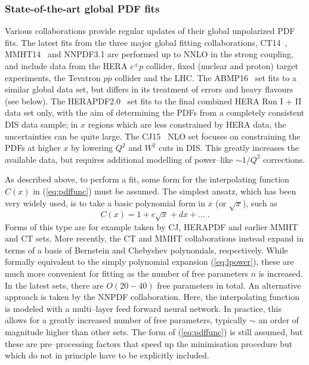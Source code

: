 \subsubsection{State-of-the-art global PDF fits}

Various collaborations provide regular updates of their global unpolarized
PDF fits.
%
The latest fits from the three major global fitting collaborations, CT14~\cite{Dulat:2015mca}, MMHT14~\cite{Harland-Lang:2014zoa} and NNPDF3.1 are performed up to NNLO in the strong coupling, and include data from the HERA $e^{\pm} p$ collider, fixed (nuclear and proton) target experiments, the Tevatron $p\overline{p}$ collider and the LHC. 
%
The ABMP16~\cite{Alekhin:2017kpj} set fits to a similar global data set, but differs in its treatment of errors and heavy flavours (see below). The HERAPDF2.0~\cite{Abramowicz:2015mha} set fits to the final combined HERA Run I + II data set only, with the aim of determining the PDFs from a completely consistent DIS data sample; in $x$ regions which are less constrained by HERA data, the uncertainties can be quite large. The CJ15~\cite{Accardi:2016qay} NLO set focuses on constraining the PDFs at higher $x$ by lowering $Q^2$ and $W^2$ cuts in DIS. This greatly increases the available data, but requires additional modelling of power--like $\sim 1/Q^2$ corrections.

As described above, to perform a fit, some form for the interpolating function $C(x)$ in (\ref{eq:pdffunc}) must be assumed. The simplest ansatz, which has been very widely used, is to take a basic polynomial form in $x$ (or $\sqrt{x}$), such as
\begin{equation}\label{eq:lpower}
C(x)=1+c\sqrt{x}+d x+...\;.
\end{equation}
Forms of this type are for example taken by CJ, HERAPDF and earlier MMHT and CT sets. More recently, the CT and MMHT collaborations instead expand in terms of a basis of  Bernstein and Chebyshev polynomials, respectively.
%
While formally equivalent to the simply polynomial expansion (\ref{eq:lpower}), these are much more convenient for fitting as the number of free parameters $n$ is increased. In the latest sets, there are $O(20-40)$ free parameters in total.
%
An alternative approach is taken by the NNPDF collaboration. Here, the interpolating function is modeled with a multi--layer feed forward neural network. In practice, this allows for a greatly increased number of free parameters, typically $\sim$ an order of magnitude higher than other sets. The form of (\ref{eq:pdffunc}) is still assumed, but these are pre--processing factors that speed up the minimisation procedure but which do not in principle have to be explicitly included. 
